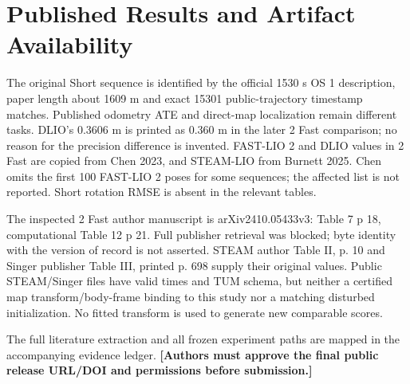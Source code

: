 \documentclass[11 pt,letterpaper]{article}
\begin{document}
\section{Published Results and Artifact Availability}
The original Short sequence is identified by the official 1530 s OS 1 description, paper length about 1609 m and exact 15301 public-trajectory timestamp matches. Published odometry ATE and direct-map localization remain different tasks. DLIO's 0.3606 m is printed as 0.360 m in the later 2 Fast comparison; no reason for the precision difference is invented. FAST-LIO 2 and DLIO values in 2 Fast are copied from Chen 2023, and STEAM-LIO from Burnett 2025. Chen omits the first 100 FAST-LIO 2 poses for some sequences; the affected list is not reported. Short rotation RMSE is absent in the relevant tables.

The inspected 2 Fast author manuscript is arXiv2410.05433v3: Table 7 p 18, computational Table 12 p 21. Full publisher retrieval was blocked; byte identity with the version of record is not asserted. STEAM author Table II, p. 10 and Singer publisher Table III, printed p. 698 supply their original values. Public STEAM/Singer files have valid times and TUM schema, but neither a certified map transform/body-frame binding to this study nor a matching disturbed initialization. No fitted transform is used to generate new comparable scores.

The full literature extraction and all frozen experiment paths are mapped in the accompanying evidence ledger. \textbf{[Authors must approve the final public release URL/DOI and permissions before submission.]}
\end{document}
